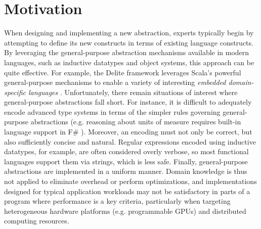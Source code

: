 \documentclass{llncs}
\begin{document}
\section{Motivation}
When designing and implementing a new abstraction, experts typically begin by attempting to define its new constructs in terms of existing language constructs.
By leveraging the {general-purpose} abstraction mechanisms available in modern languages, such as inductive datatypes and object systems, this approach can be quite effective.  
For example, the Delite framework leverages Scala's powerful general-purpose mechanisms to enable a variety of interesting \emph{embedded domain-specific languages} \cite{delite}. 
Unfortunately, there remain situations of interest where general-purpose abstractions fall short. 
For instance, it is difficult to adequately encode advanced type systems in terms of the simpler rules governing general-purpose abstractions (e.g. reasoning about units of measure requires built-in language support in F\# \cite{units-of-measure}). 
Moreover, an encoding must not only be correct, but also sufficiently concise and natural. Regular expressions encoded using inductive datatypes, for example, are often considered overly verbose, so most functional languages support them via strings, which is less safe. 
Finally, general-purpose abstractions are implemented in a uniform manner. Domain knowledge is thus not applied to eliminate overhead or perform optimizations, and implementations designed for typical application workloads may not be satisfactory in parts of a program where performance is a key criteria, particularly when targeting heterogeneous hardware platforms (e.g. programmable GPUs) and distributed computing resources.

\end{document}
